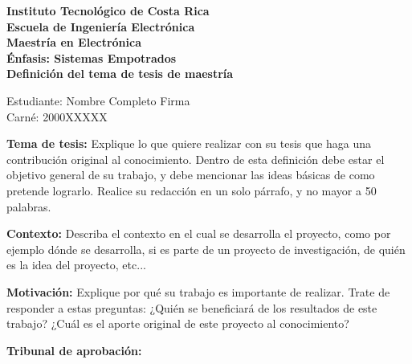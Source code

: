 \documentclass[letterpaper,12pt,spanish]{article}
\begin{document}
\pagestyle{empty}

{\bf Instituto Tecnológico de Costa Rica \\
Escuela de Ingeniería Electrónica \\
Maestría en Electrónica \\
Énfasis: Sistemas Empotrados \\
Definición del tema de tesis de maestría }

\vspace{0.5cm}
Estudiante: Nombre Completo \hfill Firma \underline{\hspace{5.5cm}} \\
Carné: 2000XXXXX


{\vspace{0.5cm} \bf Tema de tesis:} 
{Explique lo que quiere realizar con su tesis que haga una contribución 
original al conocimiento. Dentro de esta definición debe estar el objetivo 
general de su trabajo, y debe mencionar las ideas básicas de como pretende 
lograrlo. Realice su redacción en un solo párrafo, y no mayor a 50 palabras.}


{\vspace{0.5cm} \bf Contexto:} {Describa el contexto en el cual se desarrolla 
el proyecto, como por ejemplo dónde se desarrolla, si es parte de un proyecto 
de investigación, de quién es la idea del proyecto, etc...}



{\vspace{0.5cm} \bf Motivación:} {Explique por qué su trabajo es importante de 
realizar. Trate de responder a estas preguntas: ¿Quién se beneficiará de los 
resultados de este trabajo? ¿Cuál es el aporte original de este proyecto al 
conocimiento?}


\vfill

{\bf Tribunal de aprobación:}
\vspace{0.5cm}
\end{document}
